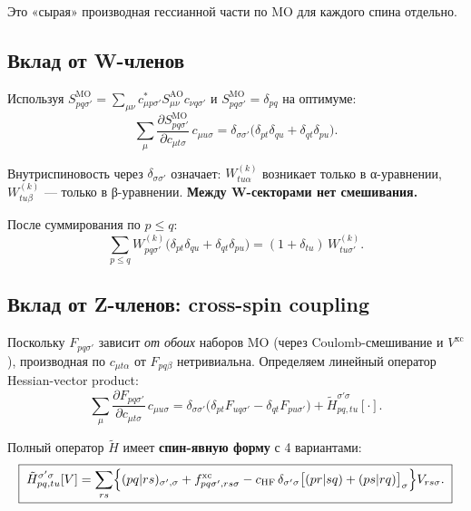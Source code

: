 \documentclass[11pt, a4paper]{article}
\theoremstyle{definition}
\newcommand{\Wk}[2]{W^{(#1)}_{#2}}
\newcommand{\MO}{\text{MO}}
\newcommand{\AO}{\text{AO}}
\newcommand{\HF}{\text{HF}}
\newcommand{\xc}{\text{xc}}
\begin{document}
Это «сырая» производная гессианной части по MO для каждого спина отдельно.

\subsection{Вклад от W-членов}

Используя $S^{\MO}_{pq\sigma'} = \sum_{\mu\nu} c^*_{\mu p \sigma'} S^{\AO}_{\mu\nu} c_{\nu q \sigma'}$ и $S^{\MO}_{pq\sigma'} = \delta_{pq}$ на оптимуме:
\begin{equation}
    \sum_\mu \frac{\partial S^{\MO}_{pq\sigma'}}{\partial c_{\mu t \sigma}}\, c_{\mu u \sigma} = \delta_{\sigma\sigma'} \bigl( \delta_{pt}\delta_{qu} + \delta_{qt}\delta_{pu} \bigr).
\end{equation}

Внутриспиновость через $\delta_{\sigma\sigma'}$ означает: $\Wk{k}{tu\alpha}$ возникает только в α-уравнении, $\Wk{k}{tu\beta}$ --- только в β-уравнении. \textbf{Между W-секторами нет смешивания.}

После суммирования по $p \le q$:
\begin{equation}
    \sum_{p \le q} \Wk{k}{pq\sigma'} \bigl( \delta_{pt}\delta_{qu} + \delta_{qt}\delta_{pu} \bigr) = (1 + \delta_{tu})\, \Wk{k}{tu\sigma'}.
\end{equation}

\subsection{Вклад от Z-членов: cross-spin coupling}

Поскольку $F_{pq\sigma'}$ зависит \emph{от обоих} наборов MO (через Coulomb-смешивание и $V^{\xc}$), производная по $c_{\mu t \alpha}$ от $F_{pq\beta}$ нетривиальна. Определяем линейный оператор Hessian-vector product:
\begin{equation}
    \sum_\mu \frac{\partial F_{pq\sigma'}}{\partial c_{\mu t \sigma}}\, c_{\mu u \sigma} = \delta_{\sigma\sigma'} \bigl( \delta_{pt} F_{uq\sigma'} - \delta_{qt} F_{pu\sigma'} \bigr) + \tilde H^{\sigma'\sigma}_{pq, tu}[\cdot].
\end{equation}

Полный оператор $\tilde H$ имеет \textbf{спин-явную форму} с 4 вариантами:
\begin{equation}
    \boxed{\;
    \tilde H^{\sigma'\sigma}_{pq, tu}[V] = \sum_{rs}\Bigl\{ (pq|rs)_{\sigma', \sigma} + f^{\xc}_{pq\sigma', rs\sigma} - c_{\HF}\, \delta_{\sigma'\sigma}\bigl[(pr|sq) + (ps|rq)\bigr]_\sigma \Bigr\} V_{rs\sigma}.
    \;}
    \label{eq:Htilde}
\end{equation}
\end{document}
